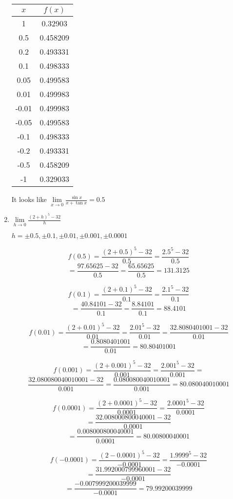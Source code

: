 \documentclass{article}
\begin{document}
\begin{enumerate}
				\begin{center}
				\begin{tabular}{|c|c|}
				\hline
				$x$ & $f(x)$ \\
				\hline \hline
				1 &  0.32903 \\
				0.5 & 0.458209 \\
				0.2 &  0.493331 \\
				0.1 &  0.498333 \\
				0.05 & 0.499583 \\
				0.01 &  0.499983 \\
				-0.01 & 0.499983 \\
				-0.05 & 0.499583\\
				-0.1 &  0.498333 \\
				-0.2 &  0.493331 \\
				-0.5 & 0.458209 \\
				-1 & 0.329033 \\
				\hline
				\end{tabular}
				\end{center}
				
				It looks like $\lim \limits _{x \to 0} \frac{\sin x}{x + \tan x} = 0.5$
			
			\item 	$\lim \limits _{h \to 0} \frac{(2 + h)^5 - 32}{h}$
			
			$h = \pm 0.5, \pm 0.1, \pm 0.01, \pm 0.001, \pm 0.0001$
			
			$$f(0.5) = \frac{(2 + 0.5)^5 -32}{0.5} = \frac{2.5^5 - 32}{0.5} $$
			$$= \frac{97.65625 - 32}{0.5} = \frac{65.65625}{0.5} = 131.3125$$
			
			$$f(0.1) = \frac{(2 + 0.1)^5 - 32}{0.1} = \frac{2.1^5 -32}{0.1} $$
			$$ = \frac{40.84101 - 32}{0.1} = \frac{8.84101}{0.1} = 88.4101$$
			
			$$f(0.01) = \frac{(2 + 0.01)^5 - 32}{0.01} = \frac{2.01^5 - 32}{0.01} = \frac{32.8080401001 - 32}{0.01} $$
			$$= \frac{0.8080401001}{0.01} = 80.80401001$$
			
			$$f(0.001) = \frac{(2+ 0.001)^5 - 32}{0.001} = \frac{2.001^5 - 32}{0.001} = $$
			$$\frac{32.080080040010001 - 32}{0.001} = \frac{0.080080040010001}{0.001} = 80.080040010001$$
			
			$$f(0.0001) = \frac{(2 + 0.0001)^5 - 32}{0.0001} = \frac{2.0001^5  - 32}{0.0001} $$
			$$= \frac{32.008000800040001 - 32}{0.0001} $$
			$$= \frac{0.008000800040001}{0.0001} = 80.00800040001$$
			
			$$f(-0.0001) = \frac{(2 - 0.0001)^5 - 32}{-0.0001}  = \frac{1.9999^5 - 32}{-0.0001}$$ 
			$$= \frac{31.992000799960001-32}{-0.0001}$$
			$$ = \frac{-0.007999200039999}{-0.0001} = 79.99200039999$$
			

\end{enumerate}
\end{document}

